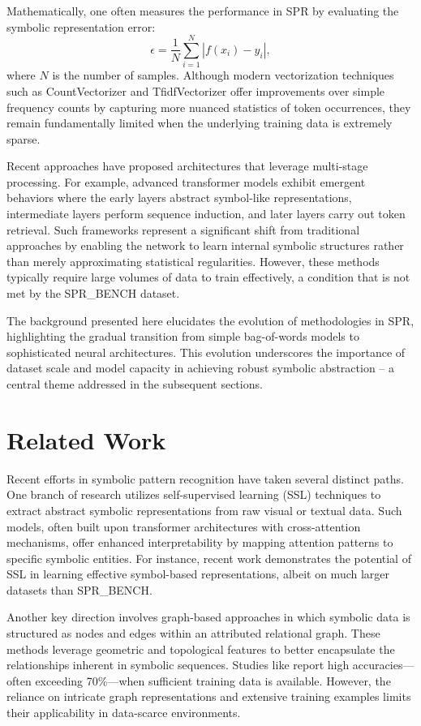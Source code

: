 \documentclass{article}
\begin{document}
Mathematically, one often measures the performance in SPR by evaluating the symbolic representation error:
\[
\epsilon = \frac{1}{N}\sum_{i=1}^{N} \left| f(x_i) - y_i \right|,
\]
where \(N\) is the number of samples. Although modern vectorization techniques such as CountVectorizer and TfidfVectorizer offer improvements over simple frequency counts by capturing more nuanced statistics of token occurrences, they remain fundamentally limited when the underlying training data is extremely sparse.

Recent approaches have proposed architectures that leverage multi-stage processing. For example, advanced transformer models exhibit emergent behaviors where the early layers abstract symbol-like representations, intermediate layers perform sequence induction, and later layers carry out token retrieval. Such frameworks represent a significant shift from traditional approaches by enabling the network to learn internal symbolic structures rather than merely approximating statistical regularities. However, these methods typically require large volumes of data to train effectively, a condition that is not met by the SPR\_BENCH dataset.

The background presented here elucidates the evolution of methodologies in SPR, highlighting the gradual transition from simple bag-of-words models to sophisticated neural architectures. This evolution underscores the importance of dataset scale and model capacity in achieving robust symbolic abstraction – a central theme addressed in the subsequent sections.

\section{Related Work}
Recent efforts in symbolic pattern recognition have taken several distinct paths. One branch of research utilizes self-supervised learning (SSL) techniques to extract abstract symbolic representations from raw visual or textual data. Such models, often built upon transformer architectures with cross-attention mechanisms, offer enhanced interpretability by mapping attention patterns to specific symbolic entities. For instance, recent work \cite{ssl_transformer} demonstrates the potential of SSL in learning effective symbol-based representations, albeit on much larger datasets than SPR\_BENCH.

Another key direction involves graph-based approaches in which symbolic data is structured as nodes and edges within an attributed relational graph. These methods leverage geometric and topological features to better encapsulate the relationships inherent in symbolic sequences. Studies like \cite{graph_signature} report high accuracies—often exceeding 70\%—when sufficient training data is available. However, the reliance on intricate graph representations and extensive training examples limits their applicability in data-scarce environments.
\end{document}
